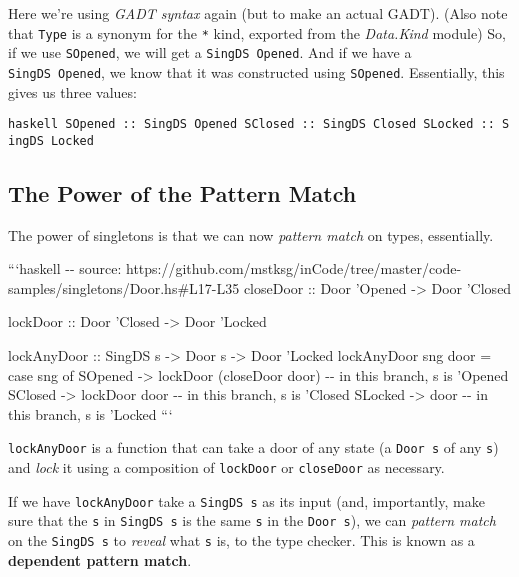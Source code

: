 \documentclass[]{article}
\begin{document}
Here we're using \emph{GADT syntax} again (but to make an actual GADT). (Also
note that \texttt{Type} is a synonym for the \texttt{*} kind, exported from the
\emph{Data.Kind} module) So, if we use \texttt{SOpened}, we will get a
\texttt{SingDS\ \textquotesingle{}Opened}. And if we have a
\texttt{SingDS\ \textquotesingle{}Opened}, we know that it was constructed using
\texttt{SOpened}. Essentially, this gives us three values:

\texttt{haskell\ SOpened\ ::\ SingDS\ \textquotesingle{}Opened\ SClosed\ ::\ SingDS\ \textquotesingle{}Closed\ SLocked\ ::\ SingDS\ \textquotesingle{}Locked}

\subsection{The Power of the Pattern Match}

The power of singletons is that we can now \emph{pattern match} on types,
essentially.

```haskell -\/- source:
https://github.com/mstksg/inCode/tree/master/code-samples/singletons/Door.hs\#L17-L35
closeDoor :: Door 'Opened -\textgreater{} Door 'Closed

lockDoor :: Door 'Closed -\textgreater{} Door 'Locked

lockAnyDoor :: SingDS s -\textgreater{} Door s -\textgreater{} Door 'Locked
lockAnyDoor sng door = case sng of SOpened -\textgreater{} lockDoor (closeDoor
door) -\/- in this branch, s is 'Opened SClosed -\textgreater{} lockDoor door
-\/- in this branch, s is 'Closed SLocked -\textgreater{} door -\/- in this
branch, s is 'Locked ```

\texttt{lockAnyDoor} is a function that can take a door of any state (a
\texttt{Door\ s} of any \texttt{s}) and \emph{lock} it using a composition of
\texttt{lockDoor} or \texttt{closeDoor} as necessary.

If we have \texttt{lockAnyDoor} take a \texttt{SingDS\ s} as its input (and,
importantly, make sure that the \texttt{s} in \texttt{SingDS\ s} is the same
\texttt{s} in the \texttt{Door\ s}), we can \emph{pattern match} on the
\texttt{SingDS\ s} to \emph{reveal} what \texttt{s} is, to the type checker.
This is known as a \textbf{dependent pattern match}.
\end{document}
